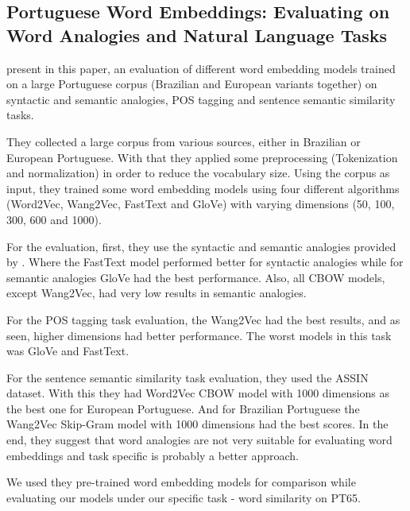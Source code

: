 
\subsection{Portuguese Word Embeddings: Evaluating on Word Analogies and Natural
Language Tasks}

 present in this paper, an evaluation of different word embedding models trained on a large Portuguese corpus (Brazilian and European variants together) on syntactic and semantic analogies, POS tagging and sentence semantic similarity tasks.

They collected a large corpus from various sources, either in Brazilian or European Portuguese. With that they applied some preprocessing (Tokenization and normalization) in order to reduce the vocabulary size. Using the corpus as input, they trained some word embedding models using four different algorithms (Word2Vec, Wang2Vec, FastText and GloVe) with varying dimensions (50, 100, 300, 600 and 1000).

For the evaluation, first, they use the syntactic and semantic analogies provided by . Where the FastText model performed better for syntactic analogies while for semantic analogies GloVe had the best performance. Also, all CBOW models, except Wang2Vec, had very low results in semantic analogies.

For the POS tagging task evaluation, the Wang2Vec had the best results, and as seen, higher dimensions had better performance. The worst models in this task was GloVe and FastText. 

For the sentence semantic similarity task evaluation, they used the ASSIN dataset. With this they had Word2Vec CBOW model with 1000 dimensions as the best one for European Portuguese. And for Brazilian Portuguese the Wang2Vec Skip-Gram model with 1000 dimensions had the best scores.
In the end, they suggest that word analogies are not very suitable for evaluating word embeddings and task specific is probably a better approach.

We used they pre-trained word embedding models for comparison while evaluating our models under our specific task - word similarity on PT65.






